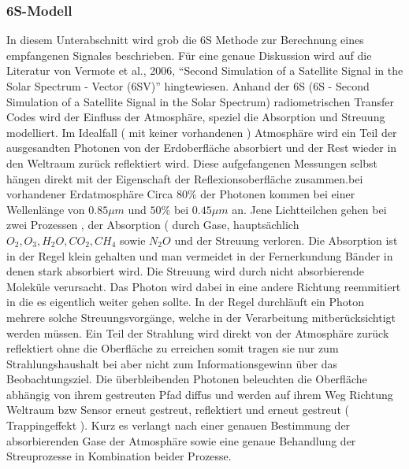 \documentclass[11pt]{report}
\begin{document}
\subsubsection{6S-Modell}
In diesem Unterabschnitt wird grob die 6S Methode zur Berechnung eines empfangenen Signales beschrieben. Für eine genaue Diskussion wird auf die Literatur von Vermote et al., 2006, "`Second Simulation of a Satellite Signal in the Solar Spectrum - Vector (6SV)"' hingtewiesen.\newline\newline
Anhand der 6S (6S - Second Simulation of a Satellite Signal in the Solar Spectrum) radiometrischen Transfer Codes wird der Einfluss der Atmosphäre, speziel die Absorption und Streuung modelliert. Im Idealfall ( mit keiner vorhandenen ) Atmosphäre wird ein Teil der ausgesandten Photonen von der Erdoberfläche absorbiert und der Rest wieder in den Weltraum zurück reflektiert wird. Diese aufgefangenen Messungen selbst hängen direkt mit der Eigenschaft der Reflexionsoberfläche zusammen.bei vorhandener Erdatmosphäre Circa $80 \%$ der Photonen kommen bei einer Wellenlänge von $0.85 \mu m$ und $50 \%$ bei $0.45 \mu m$ an. Jene Lichtteilchen gehen bei zwei Prozessen , der Absorption ( durch Gase, hauptsächlich $ O_2,O_3, H_2O,CO_2,CH_4$ sowie $N_2O$ und der Streuung verloren. Die Absorption ist in der Regel klein gehalten und man vermeidet in der Fernerkundung Bänder in denen stark absorbiert wird. Die Streuung wird durch nicht absorbierende Moleküle verursacht. Das Photon wird dabei in eine andere Richtung reemmitiert in die es eigentlich weiter gehen sollte. In der Regel durchläuft ein Photon mehrere solche Streuungsvorgänge, welche in der Verarbeitung mitberücksichtigt werden müssen.\newline
Ein Teil der Strahlung wird direkt von der Atmosphäre zurück reflektiert ohne die Oberfläche zu erreichen somit tragen sie nur zum Strahlungshaushalt bei aber nicht zum Informationsgewinn über das Beobachtungsziel. Die überbleibenden Photonen beleuchten die Oberfläche abhängig von ihrem gestreuten Pfad diffus und werden auf ihrem Weg Richtung Weltraum bzw Sensor erneut gestreut, reflektiert und erneut gestreut ( Trappingeffekt ). Kurz es verlangt nach einer genauen Bestimmung der absorbierenden Gase der Atmosphäre sowie eine genaue Behandlung der Streuprozesse in Kombination beider Prozesse. \newline

\end{document}
